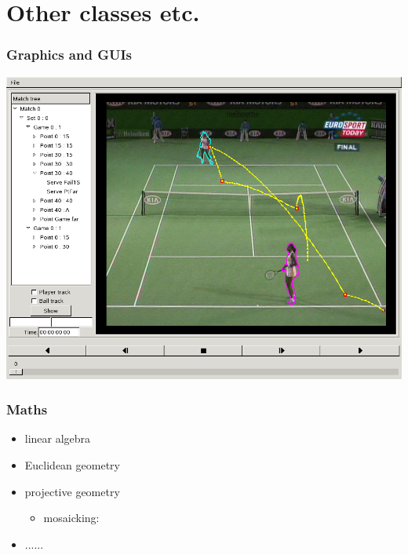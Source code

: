 \documentclass[landscape]{beamer}
\begin{document}
\section{Other classes etc.}

\begin{frame}[fragile]\frametitle{Graphics and GUIs}
  \centerline{\includegraphics[height=\textheight,width=\textwidth,keepaspectratio]{tidyBrowser}}
\end{frame}

\begin{frame}[fragile]\frametitle{Maths}

  \begin{itemize}
  \item linear algebra
  \item Euclidean geometry
  \item projective geometry
    \begin{itemize}
    \item mosaicking:
      {\color{linkcolor} \setlength{\fboxrule}{1mm} }
    \end{itemize}
  \item ......
  \end{itemize}

\end{frame}
\end{document}

